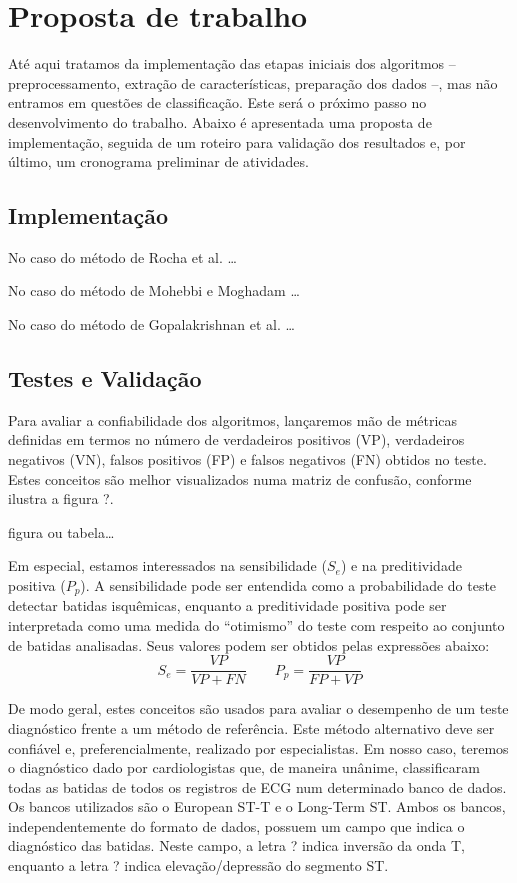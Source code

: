 
\section{Proposta de trabalho}
\label{sec:section5}
Até aqui tratamos da implementação das etapas iniciais dos algoritmos -- preprocessamento, extração de características, preparação dos dados --, mas não entramos em questões de classificação. Este será o próximo passo no desenvolvimento do trabalho. Abaixo é apresentada uma proposta de implementação, seguida de um roteiro para validação dos resultados e, por último, um cronograma preliminar de atividades.

\subsection{Implementação}
No caso do método de Rocha et al. \ldots

No caso do método de Mohebbi e Moghadam \ldots

No caso do método de Gopalakrishnan et al. \ldots

\subsection{Testes e Validação}
Para avaliar a confiabilidade dos algoritmos, lançaremos mão de métricas definidas em termos no número de verdadeiros positivos (VP), verdadeiros negativos (VN), falsos positivos (FP) e falsos negativos (FN) obtidos no teste. Estes conceitos são melhor visualizados numa matriz de confusão, conforme ilustra a figura ?.

figura ou tabela\ldots

Em especial, estamos interessados na sensibilidade ($S_e$) e na preditividade positiva ($P_p$). A sensibilidade pode ser entendida como a probabilidade do teste detectar batidas isquêmicas, enquanto a preditividade positiva pode ser interpretada como uma medida do ``otimismo'' do teste com respeito ao conjunto de batidas analisadas. Seus valores podem ser obtidos pelas expressões abaixo:
\begin{equation} \label{equ:metrics}
    S_e = \frac{VP}{VP+FN}
    \quad\quad
    P_p = \frac{VP}{FP+VP}
\end{equation}

De modo geral, estes conceitos são usados para avaliar o desempenho de um teste diagnóstico frente a um método de referência. Este método alternativo deve ser confiável e, preferencialmente, realizado por especialistas. Em nosso caso, teremos o diagnóstico dado por cardiologistas que, de maneira unânime, classificaram todas as batidas de todos os registros de ECG num determinado banco de dados. Os bancos utilizados são o European ST-T e o Long-Term ST. Ambos os bancos, independentemente do formato de dados, possuem um campo que indica o diagnóstico das batidas. Neste campo, a letra ? indica inversão da onda T, enquanto a letra ? indica elevação/depressão do segmento ST.


